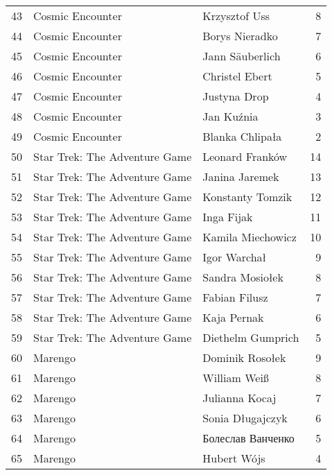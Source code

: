 \begin{table}[h]
\begin{tabular}{rllr}
 43 & Cosmic Encounter               & Krzysztof Uss         &       8 \\
 44 & Cosmic Encounter               & Borys Nieradko        &       7 \\
 45 & Cosmic Encounter               & Jann Säuberlich       &       6 \\
 46 & Cosmic Encounter               & Christel Ebert        &       5 \\
 47 & Cosmic Encounter               & Justyna Drop          &       4 \\
 48 & Cosmic Encounter               & Jan Kuźnia            &       3 \\
 49 & Cosmic Encounter               & Blanka Chlipała       &       2 \\
 50 & Star Trek: The Adventure Game  & Leonard Franków       &      14 \\
 51 & Star Trek: The Adventure Game  & Janina Jaremek        &      13 \\
 52 & Star Trek: The Adventure Game  & Konstanty Tomzik      &      12 \\
 53 & Star Trek: The Adventure Game  & Inga Fijak            &      11 \\
 54 & Star Trek: The Adventure Game  & Kamila Miechowicz     &      10 \\
 55 & Star Trek: The Adventure Game  & Igor Warchał          &       9 \\
 56 & Star Trek: The Adventure Game  & Sandra Mosiołek       &       8 \\
 57 & Star Trek: The Adventure Game  & Fabian Filusz         &       7 \\
 58 & Star Trek: The Adventure Game  & Kaja Pernak           &       6 \\
 59 & Star Trek: The Adventure Game  & Diethelm Gumprich     &       5 \\
 60 & Marengo                        & Dominik Rosołek       &       9 \\
 61 & Marengo                        & William Weiß          &       8 \\
 62 & Marengo                        & Julianna Kocaj        &       7 \\
 63 & Marengo                        & Sonia Długajczyk      &       6 \\
 64 & Marengo                        & Болеслав Ванченко     &       5 \\
 65 & Marengo                        & Hubert Wójs           &       4 \\

\end{tabular}
\end{table}
